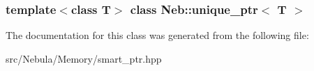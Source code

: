 \subsubsection*{template$<$class \-T$>$ class Neb\-::unique\-\_\-ptr$<$ T $>$}



\-The documentation for this class was generated from the following file\-:\begin{DoxyCompactItemize}
\item 
src/\-Nebula/\-Memory/smart\-\_\-ptr.\-hpp\end{DoxyCompactItemize}
